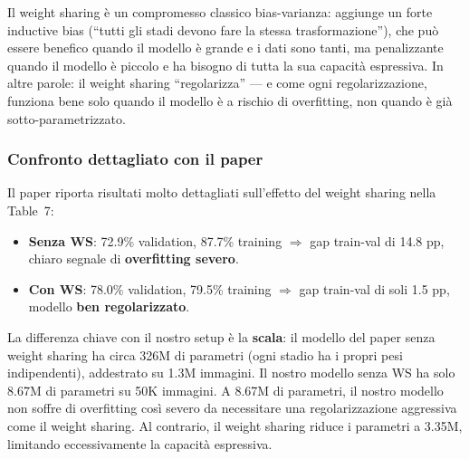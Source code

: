 \documentclass[12pt,a4paper]{article}
\begin{document}
\begin{notabox}
Il weight sharing \`e un compromesso classico bias-varianza: aggiunge un forte inductive bias (``tutti gli stadi devono fare la stessa trasformazione''), che pu\`o essere benefico quando il modello \`e grande e i dati sono tanti, ma penalizzante quando il modello \`e piccolo e ha bisogno di tutta la sua capacit\`a espressiva. In altre parole: il weight sharing ``regolarizza'' --- e come ogni regolarizzazione, funziona bene solo quando il modello \`e a rischio di overfitting, non quando \`e gi\`a sotto-parametrizzato.
\end{notabox}

\subsubsection{Confronto dettagliato con il paper}

Il paper riporta risultati molto dettagliati sull'effetto del weight sharing nella Table~7:
\begin{itemize}
    \item \textbf{Senza WS}: 72.9\% validation, 87.7\% training $\Rightarrow$ gap train-val di 14.8 pp, chiaro segnale di \textbf{overfitting severo}.
    \item \textbf{Con WS}: 78.0\% validation, 79.5\% training $\Rightarrow$ gap train-val di soli 1.5 pp, modello \textbf{ben regolarizzato}.
\end{itemize}

La differenza chiave con il nostro setup \`e la \textbf{scala}: il modello del paper senza weight sharing ha circa 326M di parametri (ogni stadio ha i propri pesi indipendenti), addestrato su 1.3M immagini. Il nostro modello senza WS ha solo 8.67M di parametri su 50K immagini. A 8.67M di parametri, il nostro modello non soffre di overfitting cos\`i severo da necessitare una regolarizzazione aggressiva come il weight sharing. Al contrario, il weight sharing riduce i parametri a 3.35M, limitando eccessivamente la capacit\`a espressiva.
\end{document}
